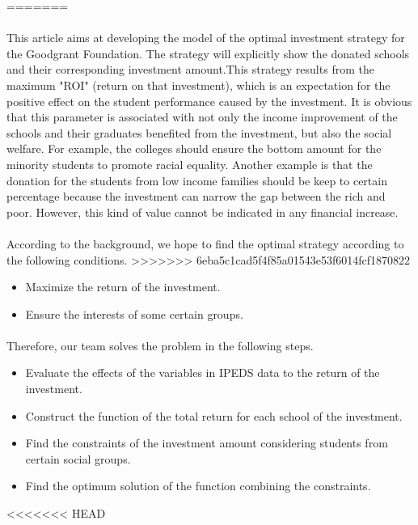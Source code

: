 \documentclass{mcmthesis}
\begin{document}
=======
\paragraph{} This article aims at developing the model of the optimal investment strategy for the Goodgrant Foundation. The strategy will explicitly show the donated schools and their corresponding investment amount.This strategy results from the maximum "ROI" (return on that investment), which is an expectation for the positive effect on the student performance caused by the investment. It is obvious that this parameter is associated with not only the income improvement of the schools and their graduates benefited from the investment, but also the social welfare. For example, the colleges should ensure the bottom amount for the minority students to promote racial equality. Another example is that the donation for the students from low income families should be keep to certain percentage because the investment can narrow the gap between the rich and poor. However, this kind of value cannot be indicated in any financial increase.
\paragraph{} According to the background, we hope to find the optimal strategy according to the following conditions.
>>>>>>> 6eba5c1cad5f4f85a01543e53f6014fcf1870822
\begin{itemize}
\item Maximize the return of the investment.
\item Ensure the interests of some certain groups.
\end{itemize}
\paragraph{} Therefore, our team solves the problem in the following steps.

\begin{itemize}
\item Evaluate the effects of the variables in IPEDS data to the return of the investment.
\item Construct the function of the total return for each school of the investment.
\item Find the constraints of the investment amount considering students from certain social groups.
\item Find the optimum solution of the function combining the  constraints.
\end{itemize}
<<<<<<< HEAD
\end{document}
